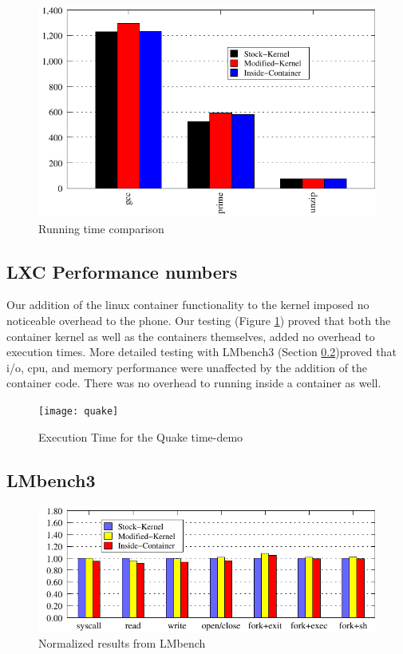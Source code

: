 \begin{figure}[tbh]
\centering
\includegraphics[width=1.0\columnwidth]{perf}
\caption{Running time comparison}
\label{fig:perf}
\end{figure}

\subsection{LXC Performance numbers}

Our addition of the linux container functionality to the kernel imposed no noticeable overhead to the phone.  Our testing (Figure \ref{fig:perf}) proved that both the container kernel as well as the containers themselves, added no overhead to execution times.  More detailed testing with LMbench3 (Section \ref{sec:LMbench3})proved that i/o, cpu, and memory performance were unaffected by the addition of the container code.  There was no overhead to running inside a container as well.  

\begin{figure}[tbh]
\centering
\texttt{[image: quake]}
\caption{Execution Time for the Quake time-demo}
\label{fig:Quake}
\end{figure}

\subsection{LMbench3} 
\label{sec:LMbench3}

\begin{figure}[bth]
\centering
\includegraphics[width=1.0\columnwidth]{lmbench}
\caption{Normalized results from LMbench}
\label{fig:lmbench}
\end{figure}

